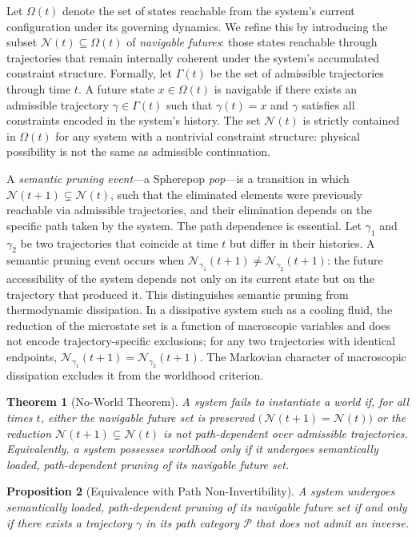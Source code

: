 \documentclass[11pt]{article}
\newtheorem{theorem}{Theorem}[section]
\newtheorem{proposition}[theorem]{Proposition}
\theoremstyle{definition}
\theoremstyle{remark}
\begin{document}
Let $\Omega(t)$ denote the set of states reachable from the system's current configuration
under its governing dynamics. We refine this by introducing the subset $\mathcal{N}(t)
\subseteq \Omega(t)$ of \emph{navigable futures}: those states reachable through trajectories
that remain internally coherent under the system's accumulated constraint structure.
Formally, let $\Gamma(t)$ be the set of admissible trajectories through time $t$. A future
state $x \in \Omega(t)$ is navigable if there exists an admissible trajectory $\gamma \in
\Gamma(t)$ such that $\gamma(t) = x$ and $\gamma$ satisfies all constraints encoded in
the system's history. The set $\mathcal{N}(t)$ is strictly contained in $\Omega(t)$ for
any system with a nontrivial constraint structure: physical possibility is not the same as
admissible continuation.

A \emph{semantic pruning event}---a Spherepop \emph{pop}---is a transition in which
$\mathcal{N}(t+1) \subsetneq \mathcal{N}(t)$, such that the eliminated elements were
previously reachable via admissible trajectories, and their elimination depends on the
specific path taken by the system. The path dependence is essential. Let $\gamma_1$ and
$\gamma_2$ be two trajectories that coincide at time $t$ but differ in their histories.
A semantic pruning event occurs when $\mathcal{N}_{\gamma_1}(t+1) \neq
\mathcal{N}_{\gamma_2}(t+1)$: the future accessibility of the system depends not only
on its current state but on the trajectory that produced it. This distinguishes semantic
pruning from thermodynamic dissipation. In a dissipative system such as a cooling fluid,
the reduction of the microstate set is a function of macroscopic variables and does not
encode trajectory-specific exclusions; for any two trajectories with identical endpoints,
$\mathcal{N}_{\gamma_1}(t+1) = \mathcal{N}_{\gamma_2}(t+1)$. The Markovian character of
macroscopic dissipation excludes it from the worldhood criterion.

\begin{theorem}[No-World Theorem]
A system fails to instantiate a world if, for all times $t$, either the navigable future
set is preserved $($\,$\mathcal{N}(t+1) = \mathcal{N}(t)$$)$ or the reduction
$\mathcal{N}(t+1) \subsetneq \mathcal{N}(t)$ is not path-dependent over admissible
trajectories. Equivalently, a system possesses worldhood only if it undergoes semantically
loaded, path-dependent pruning of its navigable future set.
\end{theorem}

\begin{proposition}[Equivalence with Path Non-Invertibility]
A system undergoes semantically loaded, path-dependent pruning of its navigable future
set if and only if there exists a trajectory $\gamma$ in its path category $\mathcal{P}$
that does not admit an inverse.
\end{proposition}
\end{document}
